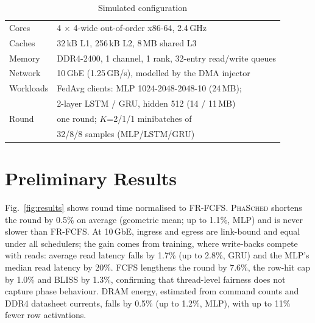 \documentclass[conference]{IEEEtran}
\newcommand{\name}{\textsc{PhaSched}}
\begin{document}
\begin{table}[t]
\centering
\caption{Simulated configuration}
\label{tab:config}
\footnotesize
\begin{tabular}{@{}ll@{}}
\toprule
Cores & 4 $\times$ 4-wide out-of-order x86-64, 2.4\,GHz \\
Caches & 32\,kB L1, 256\,kB L2, 8\,MB shared L3 \\
Memory & DDR4-2400, 1 channel, 1 rank, 32-entry read/write queues \\
Network & 10\,GbE (1.25\,GB/s), modelled by the DMA injector \\
Workloads & FedAvg clients: MLP 1024-2048-2048-10 (24\,MB); \\
 & 2-layer LSTM / GRU, hidden 512 (14 / 11\,MB) \\
Round & one round; $K$=2/1/1 minibatches of \\
 & 32/8/8 samples (MLP/LSTM/GRU) \\
\bottomrule
\end{tabular}
\end{table}

\section{Preliminary Results}
Fig.~\ref{fig:results} shows round time normalised to FR-FCFS. \name{} shortens the round by 0.5\% on average (geometric mean; up to 1.1\%, MLP) and is never slower than FR-FCFS. At 10\,GbE, ingress and egress are link-bound and equal under all schedulers; the gain comes from training, where write-backs compete with reads: average read latency falls by 1.7\% (up to 2.8\%, GRU) and the MLP's median read latency by 20\%. FCFS lengthens the round by 7.6\%, the row-hit cap by 1.0\% and BLISS by 1.3\%, confirming that thread-level fairness does not capture phase behaviour. DRAM energy, estimated from command counts and DDR4 datasheet currents, falls by 0.5\% (up to 1.2\%, MLP), with up to 11\% fewer row activations.
\end{document}
